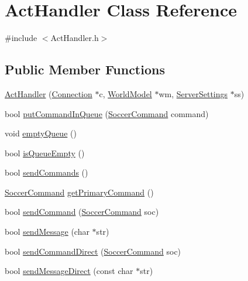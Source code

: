 \hypertarget{classActHandler}{}\section{Act\+Handler Class Reference}
\label{classActHandler}


{\ttfamily \#include $<$Act\+Handler.\+h$>$}

\subsection*{Public Member Functions}
\begin{DoxyCompactItemize}
\item 
\hyperlink{classActHandler_a33150037eae151edb5b068f2e72578c6}{Act\+Handler} (\hyperlink{classConnection}{Connection} $\ast$c, \hyperlink{classWorldModel}{World\+Model} $\ast$wm, \hyperlink{classServerSettings}{Server\+Settings} $\ast$ss)
\item 
bool \hyperlink{classActHandler_a898c8d843a88987196c8ea6a0ed18dec}{put\+Command\+In\+Queue} (\hyperlink{classSoccerCommand}{Soccer\+Command} command)
\item 
void \hyperlink{classActHandler_aaeab199c583cfe59252a5a7362d5b323}{empty\+Queue} ()
\item 
bool \hyperlink{classActHandler_a6c3bd023bea79f7cb7e8d2662641833a}{is\+Queue\+Empty} ()
\item 
bool \hyperlink{classActHandler_ab02a24e7c74fcaec56b0991a919a5e2e}{send\+Commands} ()
\item 
\hyperlink{classSoccerCommand}{Soccer\+Command} \hyperlink{classActHandler_a8ec983b87912733c9c2157e7d260fe57}{get\+Primary\+Command} ()
\item 
bool \hyperlink{classActHandler_a20294f4c12fb509bf05190942c7230cb}{send\+Command} (\hyperlink{classSoccerCommand}{Soccer\+Command} soc)
\item 
bool \hyperlink{classActHandler_aeb11ace593effbc3ac8cbbeb8bdafe69}{send\+Message} (char $\ast$str)
\item 
bool \hyperlink{classActHandler_a50f4ef305e795ed8714b7051dfda5916}{send\+Command\+Direct} (\hyperlink{classSoccerCommand}{Soccer\+Command} soc)
\item 
bool \hyperlink{classActHandler_a18b509f726900ddc2aaeb6accba9384e}{send\+Message\+Direct} (const char $\ast$str)
\end{DoxyCompactItemize}


